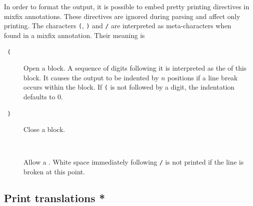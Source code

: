 In order to format the output, it is possible to embed pretty printing
directives in mixfix annotations.  These directives are ignored during parsing
and affect only printing.  The characters {\tt(}, {\tt)} and {\tt/} are
interpreted as meta-characters when found in a mixfix
annotation.  Their meaning is
\begin{description}
\item[~{\tt(}~] Open a block.  A sequence of digits following it is
  interpreted as the  of this block.  It causes the
  output to be indented by $n$ positions if a line break occurs within the
  block.  If {\tt(} is not followed by a digit, the indentation defaults to
  $0$.
\item[~{\tt)}~] Close a block.
\item[~\ttindex{/}~] Allow a .  White space immediately
  following {\tt/} is not printed if the line is broken at this point.
\end{description}

\subsection{Print translations *}
\label{Print-translations}

